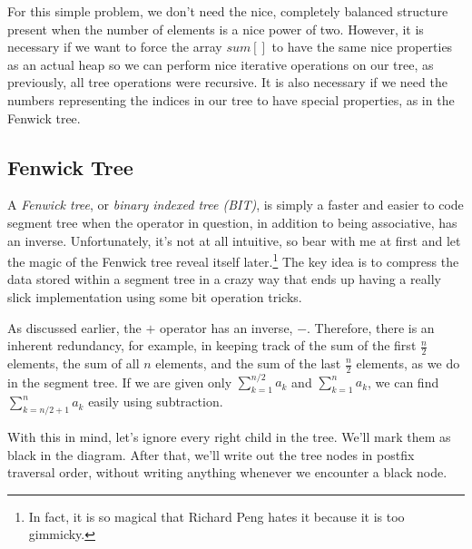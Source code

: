 For this simple problem, we don't need the nice, completely balanced structure present when the number of elements is a nice power of two. However, it is necessary if we want to force the array $sum[]$ to have the same nice properties as an actual heap so we can perform nice iterative operations on our tree, as previously, all tree operations were recursive. It is also necessary if we need the numbers representing the indices in our tree to have special properties, as in the Fenwick tree.

\subsection{Fenwick Tree}

A \textit{Fenwick tree}, or \textit{binary indexed tree (BIT)}, is simply a faster and easier to code segment tree when the operator in question, in addition to being associative, has an inverse. Unfortunately, it's not at all intuitive, so bear with me at first and let the magic of the Fenwick tree reveal itself later.\footnote{In fact, it is so magical that Richard Peng hates it because it is too gimmicky.} The key idea is to compress the data stored within a segment tree in a crazy way that ends up having a really slick implementation using some bit operation tricks.

As discussed earlier, the $+$ operator has an inverse, $-$. Therefore, there is an inherent redundancy, for example, in keeping track of the sum of the first $\frac{n}{2}$ elements, the sum of all $n$ elements, and the sum of the last $\frac{n}{2}$ elements, as we do in the segment tree. If we are given only $\sum_{k=1}^{n/2} a_k$ and $\sum_{k=1}^n a_k$, we can find $\sum_{k=n/2+1}^{n} a_k$ easily using subtraction.

With this in mind, let's ignore every right child in the tree. We'll mark them as black in the diagram. After that, we'll write out the tree nodes in postfix traversal order, without writing anything whenever we encounter a black node.

